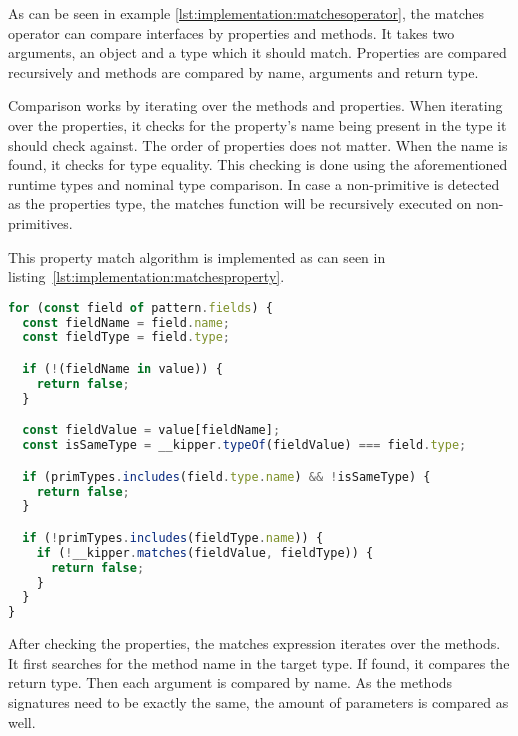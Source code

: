 As can be seen in example \ref{lst:implementation:matchesoperator}, the matches operator can compare interfaces by properties and methods. It takes two arguments, an object and a type which it should match. Properties are compared recursively and methods are compared by name, arguments and return type.

Comparison works by iterating over the methods and properties. When iterating over the properties, it checks for the property's name being present in the type it should check against. The order of properties does not matter. When the name is found, it checks for type equality. This checking is done using the aforementioned runtime types and nominal type comparison. In case a non-primitive is detected as the properties type, the matches function will be recursively executed on non-primitives.

This property match algorithm is implemented as can seen in listing~\ref{lst:implementation:matchesproperty}.

\begin{lstlisting}[language=Typescript,caption=Matches operator property comparison,label=lst:implementation:matchesproperty]
for (const field of pattern.fields) {
  const fieldName = field.name;
  const fieldType = field.type;

  if (!(fieldName in value)) {
    return false;
  }

  const fieldValue = value[fieldName];
  const isSameType = __kipper.typeOf(fieldValue) === field.type;

  if (primTypes.includes(field.type.name) && !isSameType) {
    return false;
  }

  if (!primTypes.includes(fieldType.name)) {
    if (!__kipper.matches(fieldValue, fieldType)) {
      return false;
    }
  }
}
\end{lstlisting}

After checking the properties, the matches expression iterates over the methods. It first searches for the method name in the target type. If found, it compares the return type. Then each argument is compared by name. As the methods signatures need to be exactly the same, the amount of parameters is compared as well.


